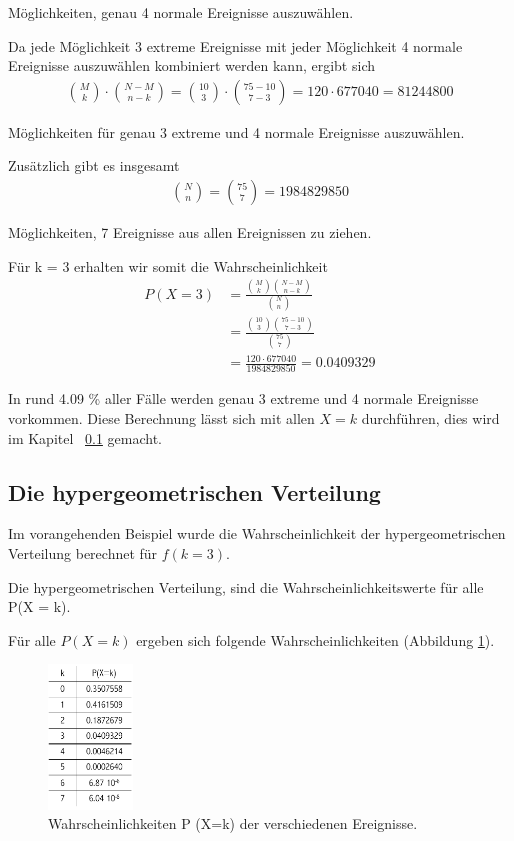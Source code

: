 \begin{refsection}
Möglichkeiten, genau 4 normale Ereignisse auszuwählen.

Da jede Möglichkeit 3 extreme Ereignisse mit jeder Möglichkeit 4 normale Ereignisse auszuwählen kombiniert werden kann, ergibt sich
\begin{align*}
\binom{M}{k} \cdot \binom{N-M}{n-k} = \binom{10}{3} \cdot \binom{75-10}{7-3} = 120 
\cdot 677040 = 81244800
\end{align*}

Möglichkeiten für genau 3 extreme und 4 normale Ereignisse auszuwählen.


Zusätzlich gibt es insgesamt
\begin{align*}
\binom{N}{n} = \binom{75}{7} = 1984829850
\end{align*}

Möglichkeiten, 7 Ereignisse aus allen Ereignissen zu ziehen.


Für k = 3 erhalten wir somit die Wahrscheinlichkeit
\begin{align*}
P(X = 3) &= \frac{ \binom{M}{k} \binom{N-M}{n-k}}{ \binom{N}{n} }  \\
&= \frac{ \binom{10}{3} \binom{75-10}{7-3}}{ \binom{75}{7} } \\
&= \frac{ 120 \cdot 677040}{ 1984829850 } = 0.0409329
\end{align*}

In rund 4.09 \% aller Fälle werden genau 3 extreme und 4 normale Ereignisse vorkommen. Diese Berechnung lässt sich mit allen $X=k$ durchführen, dies wird im Kapitel ~\ref{Dichtehyper}  gemacht.


\subsection{Die hypergeometrischen Verteilung} \label{Dichtehyper}
Im vorangehenden Beispiel wurde die Wahrscheinlichkeit der hypergeometrischen Verteilung berechnet für $f(k = 3)$. 

\begin{definition}
Die hypergeometrischen Verteilung, sind die Wahrscheinlichkeitswerte für alle P(X = k).
\end{definition}

Für alle $P (X=k)$ ergeben sich folgende Wahrscheinlichkeiten (Abbildung \ref{TabHyper}).

\begin{figure}[htbp]
\centering
\includegraphics[width=0.2\textwidth]{extrem/TabHyper.pdf}
\caption{Wahrscheinlichkeiten P (X=k) der verschiedenen Ereignisse.}
\label{TabHyper}
\end{figure}


\end{refsection}
